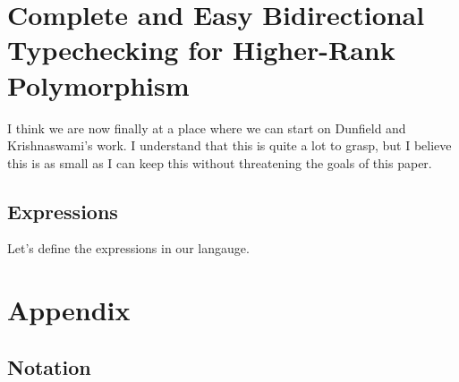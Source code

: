 \documentclass[a4paper,11pt]{article}
\def\resethooks{%
  \global\let\SaveRestoreHook\empty
  \global\let\ColumnHook\empty}
\begin{document}
\section{Complete and Easy Bidirectional Typechecking for Higher-Rank Polymorphism}
I think we are now finally at a place where we can start on Dunfield and Krishnaswami's work. 
I understand that this is quite a lot to grasp, but I believe this is as small as I can keep this without threatening 
the goals of this paper. 

\subsection{Expressions}
Let's define the expressions in our langauge. 

\begin{hscode}\SaveRestoreHook
\ColumnHook
\end{hscode}\resethooks

\appendix 
\section{\bf{Appendix}}
\subsection{\bf{Notation}}
\end{document}

